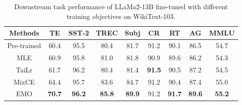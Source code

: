 \begin{table}[h!]
    \centering
    \small
    \begin{tabular}{ccccccccc}
    \toprule
    \textbf{Methods} & \textbf{TE} & \textbf{SST-2} & \textbf{TREC} & \textbf{Subj} & \textbf{CR}   & \textbf{RT} & \textbf{AG} & \textbf{MMLU} \\
    \midrule
    Pre-trained      &60.4                     &95.5            &80.4           &81.7           &91.2           &90.1                      &86.5               &54.7           \\
    MLE              &60.9                     &95.8            &81.0           &81.8           &90.9           &89.6                      &86.2               &54.3           \\
    TaiLr            &61.7                    &96.2           &80.4           &81.4           &\textbf{91.5}           &90.5                      &87.2               &54.5           \\
    MixCE            &64.4                     &95.7            &83.6           &84.7  &91.2           &90.4                      &87.4              &55.0           \\
    \midrule
    EMO             &\textbf{70.7}            &\textbf{96.2}   &\textbf{85.8}  &\textbf{89.9}           &91.2  &\textbf{91.7}                      &\textbf{89.6}      &\textbf{55.2}           \\
    \bottomrule
    \end{tabular}
    \caption{Downstream task performance of LLaMa2-13B fine-tuned with different training objectives on WikiText-103.}
    \label{table:llama2-13b}
\end{table}
